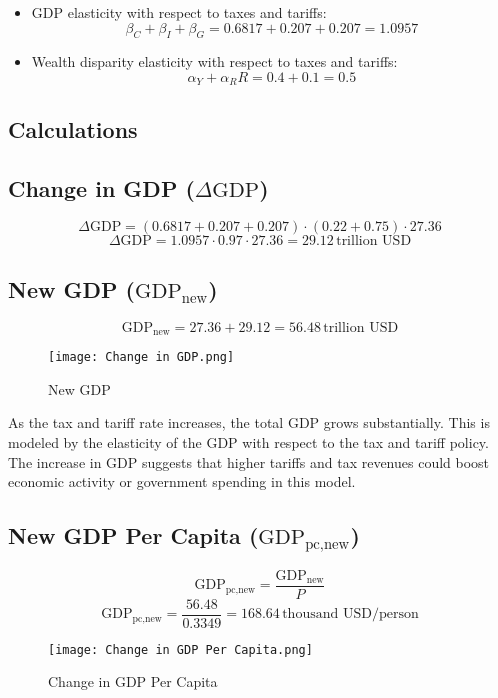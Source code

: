 \documentclass[12pt,letterpaper]{article}
\begin{document}
\begin{itemize}
    \item GDP elasticity with respect to taxes and tariffs:
    \[
    \beta_C + \beta_I + \beta_G = 0.6817 + 0.207 + 0.207 = 1.0957
    \]
    \item Wealth disparity elasticity with respect to taxes and tariffs:
    \[
    \alpha_Y + \alpha_RR = 0.4 + 0.1 = 0.5
    \]
\end{itemize}

\subsection{Calculations}

\subsection*{Change in GDP (\( \Delta \text{GDP} \))}

\[
\Delta \text{GDP} = (0.6817 + 0.207 + 0.207) \cdot (0.22 + 0.75) \cdot 27.36
\]
\[
\Delta \text{GDP} = 1.0957 \cdot 0.97 \cdot 27.36 = 29.12 \, \text{trillion USD}
\]

\subsection*{New GDP (\( \text{GDP}_{\text{new}} \))}

\[
\text{GDP}_{\text{new}} = 27.36 + 29.12 = 56.48 \, \text{trillion USD}
\]
\begin{figure} [ht]
    \centering
    \texttt{[image: Change in GDP.png]}
    \caption{New GDP}
    \label{fig:1}
\end{figure}

\indent As the tax and tariff rate increases, the total GDP grows substantially. This is modeled by the elasticity of the GDP with respect to the tax and tariff policy. The increase in GDP suggests that higher tariffs and tax revenues could boost economic activity or government spending in this model.

\subsection*{New GDP Per Capita (\( \text{GDP}_{\text{pc,new}} \))}
\[
\text{GDP}_{\text{pc,new}} = \frac{\text{GDP}_{\text{new}}}{P}
\]
\[
\text{GDP}_{\text{pc,new}} = \frac{56.48}{0.3349} = 168.64 \, \text{thousand USD/person}
\]

\begin{figure} [ht]
    \centering
    \texttt{[image: Change in GDP Per Capita.png]}
    \caption{Change in GDP Per Capita}
    \label{fig:2}
\end{figure}
\end{document}
